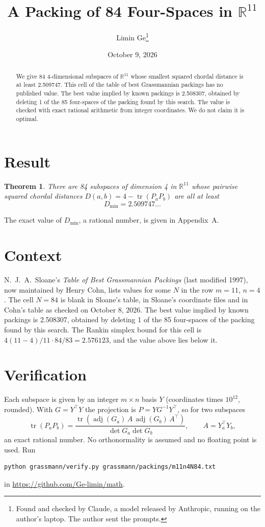 \documentclass[11pt,a4paper]{article}
\title{A Packing of 84 Four-Spaces in $\mathbb{R}^{11}$}
\author{Limin Ge\thanks{Found and checked by Claude, a model released by Anthropic, running on the author's laptop. The author sent the prompts.}}
\date{October 9, 2026}
\newtheorem*{theorem}{Theorem}
\begin{document}
\maketitle
\begin{abstract}
We give 84 4-dimensional subspaces of $\mathbb{R}^{11}$ whose smallest squared chordal distance is at least 2.509747. This cell of the table of best Grassmannian packings has no published value. The best value implied by known packings is 2.508307, obtained by deleting 1 of the 85 four-spaces of the packing found by this search. The value is checked with exact rational arithmetic from integer coordinates. We do not claim it is optimal.
\end{abstract}

\section{Result}
\begin{theorem}
There are 84 subspaces of dimension 4 in $\mathbb{R}^{11}$ whose pairwise squared chordal distances $D(a,b) = 4 - \operatorname{tr}(P_aP_b)$ are all at least
\[ D_{\min} = 2.509747\ldots \]
\end{theorem}
The exact value of $D_{\min}$, a rational number, is given in Appendix~A.


\section{Context}
N.~J.~A.~Sloane's \emph{Table of Best Grassmannian Packings} (last modified 1997), now maintained by Henry Cohn, lists values for some $N$ in the row $m=11$, $n=4$. The cell $N=84$ is blank in Sloane's table, in Sloane's coordinate files and in Cohn's table as checked on October 8, 2026. The best value implied by known packings is 2.508307, obtained by deleting 1 of the 85 four-spaces of the packing found by this search. The Rankin simplex bound for this cell is $4(11-4)/11\cdot 84/83 = 2.576123$, and the value above lies below it.


\section{Verification}
Each subspace is given by an integer $m\times n$ basis $Y$ (coordinates times $10^{12}$, rounded). With $G=Y^\top Y$ the projection is $P=YG^{-1}Y^\top$, so for two subspaces
\[ \operatorname{tr}(P_aP_b)=\frac{\operatorname{tr}(\operatorname{adj}(G_a)\,A\,\operatorname{adj}(G_b)\,A^\top)}{\det G_a\det G_b},\qquad A=Y_a^\top Y_b, \]
an exact rational number. No orthonormality is assumed and no floating point is used. Run
\begin{verbatim}
python grassmann/verify.py grassmann/packings/m11n4N84.txt
\end{verbatim}
in \url{https://github.com/Ge-limin/math}.
\end{document}
